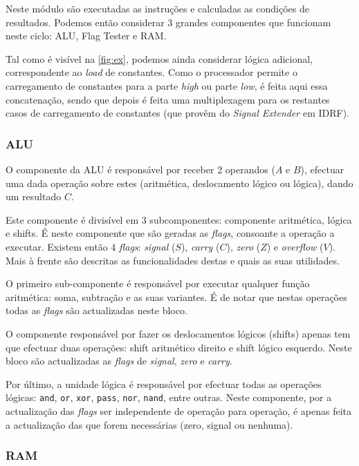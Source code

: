 \documentclass[a4paper]{article}
\begin{document}
			Neste módulo são executadas as instruções e calculadas as condições de resultados. Podemos então considerar 3 grandes componentes que funcionam neste ciclo: ALU, Flag Tester e RAM.
			
			Tal como é visível na \autoref{fig:ex}, podemos ainda considerar lógica adicional, correspondente ao \textit{load} de constantes. Como o processador permite o carregamento de constantes para a parte \textit{high} ou parte \textit{low}, é feita aqui essa concatenação, sendo que depois é feita uma multiplexagem para os restantes casos de carregamento de constantes (que provêm do \textit{Signal Extender} em IDRF).
		
			\subsubsection{ALU}
				
				O componente da ALU é responsável por receber 2 operandos ($A$ e $B$), efectuar uma dada operação sobre estes (aritmética, deslocamento lógico ou lógica), dando um resultado $C$.
				
				Este componente é divisível em 3 subcomponentes: componente aritmética, lógica e shifts. É neste componente que são geradas as \textit{flags}, consoante a operação a executar. Existem então 4 \textit{flags}: \textit{signal} ($S$), \textit{carry} ($C$), \textit{zero} ($Z$) e \textit{overflow} ($V$). Mais à frente são descritas as funcionalidades destas e quais as suas utilidades.
				
				O primeiro sub-componente é responsável por executar qualquer função aritmética: soma, subtração e as suas variantes. É de notar que nestas operações todas as \textit{flags} são actualizadas neste bloco.
				
				O componente responsável por fazer os deslocamentos lógicos (shifts) apenas tem que efectuar duas operações: shift aritmético direito e shift lógico esquerdo. Neste bloco são actualizadas as \textit{flags} de \textit{signal}, \textit{zero} e \textit{carry}.
				
				Por último, a unidade lógica é responsável por efectuar todas as operações lógicas: \texttt{and}, \texttt{or}, \texttt{xor}, \texttt{pass}, \texttt{nor}, \texttt{nand}, entre outras. Neste componente, por a actualização das \textit{flags} ser independente de operação para operação, é apenas feita a actualização das que forem necessárias (zero, signal ou nenhuma).
			
			\subsubsection{RAM}
				
\end{document}
